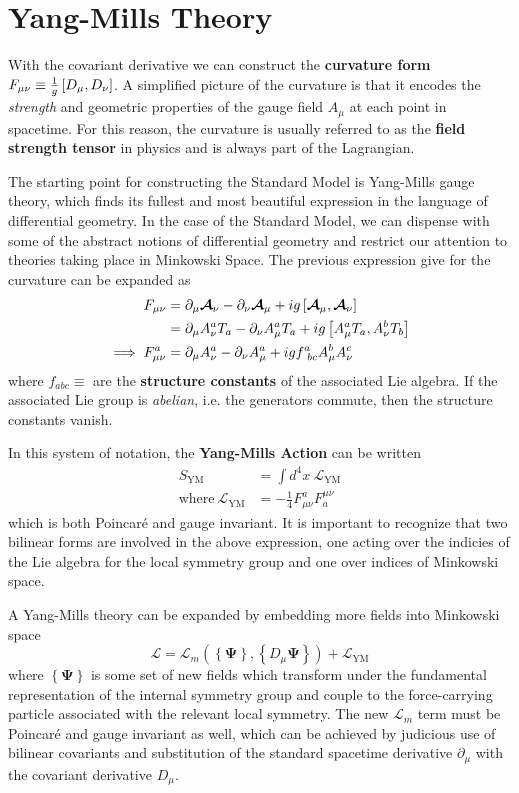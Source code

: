 \section{Yang-Mills Theory}
With the covariant derivative we can construct the \textbf{curvature form} $F_{\mu\nu} \equiv \frac{1}{g}  \left[ {D_\mu},{D_\nu} \right] $.
A simplified picture of the curvature is that it encodes the \textit{strength} and geometric properties of the gauge field $A_\mu$ at each point in spacetime.
For this reason, the curvature is usually referred to as the \textbf{field strength tensor} in physics and is always part of the Lagrangian.

The starting point for constructing the Standard Model is Yang-Mills gauge theory, which finds its fullest and most beautiful expression in the language of differential geometry.
In the case of the Standard Model, we can dispense with some of the abstract notions of differential geometry and restrict our attention to theories taking place in Minkowski Space.
The previous expression give for the curvature can be expanded as
\begin{align}
    F_{\mu\nu} &= \partial_\mu  \boldsymbol{\mathcal{A}} _\nu - \partial_\nu  \boldsymbol{\mathcal{A}} _\mu + ig \left[ { \boldsymbol{\mathcal{A}} _\mu},{ \boldsymbol{\mathcal{A}} _\nu} \right] \\
    &= \partial_\mu A_\nu^aT_a - \partial_\nu A_\mu^aT_a + ig \left[ {A_\mu^aT_a},{A_\nu^bT_b} \right] \\
    \implies F_{\mu\nu}^a &= \partial_\mu A_\nu^a - \partial_\nu A_\mu^a + igf^a_{\ bc}A_\mu^bA_\nu^c
\end{align}
where $f_{abc} \equiv $ are the \textbf{structure constants} of the associated Lie algebra.
If the associated Lie group is \textit{abelian}, i.e. the generators commute, then the structure constants vanish.

In this system of notation, the \textbf{Yang-Mills Action} can be written
\newcommand{\YML}{ \ensuremath{ \mathcal{L}_{\mathrm{YM}} } }
\begin{align}
    S_{\mathrm{YM}} &= \int d^4x\ \YML\\
    \mathrm{where}\ \YML &= -\frac{1}{4} F_{\mu\nu}^a F^{\mu\nu}_a
\end{align}
which is both Poincar\'{e} and gauge invariant. It is important to recognize that two bilinear forms are involved in the above expression, one acting over the indicies of the Lie algebra for the local symmetry group and one over indices of Minkowski space.

A Yang-Mills theory can be expanded by embedding more fields into Minkowski space
\newcommand{\YM}{ \ensuremath{ \mathcal{L}_m\left( \left\{ \boldsymbol\Psi \right\}, \left\{ D_\mu \boldsymbol\Psi \right\} \right) }}
\begin{equation}
    \mathcal{L} = \YM + \YML
\end{equation}
where $\left\{ \boldsymbol\Psi \right\}$ is some set of new fields which transform under the fundamental representation of the internal symmetry group and couple to the force-carrying particle associated with the relevant local symmetry.
The new $\mathcal{L}_m$ term must be Poincar\'{e} and gauge invariant as well, which can be achieved by judicious use of bilinear covariants and substitution of the standard spacetime derivative $\partial_\mu$ with the covariant derivative $D_\mu$.

